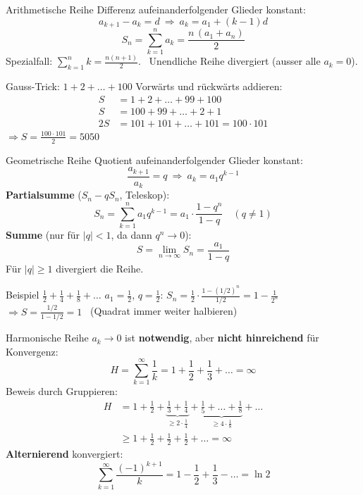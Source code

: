 \documentclass[a4paper, fontsize=7pt]{scrartcl}
\begin{document}
\begin{mainbox}{Arithmetische Reihe}
Differenz aufeinanderfolgender Glieder konstant:
$$a_{k+1} - a_k = d \ \Rightarrow\ a_k = a_1 + (k-1)d$$
$$\boxed{S_n = \sum_{k=1}^{n} a_k = \frac{n\,(a_1 + a_n)}{2}}$$
Spezialfall: $\sum_{k=1}^{n} k = \frac{n(n+1)}{2}$. \ Unendliche Reihe
divergiert (ausser alle $a_k = 0$).
\end{mainbox}

\begin{subbox}{Gauss-Trick: $1 + 2 + \ldots + 100$}
Vorwärts und rückwärts addieren:
\begin{align*}
S &= 1 + 2 + \ldots + 99 + 100\\
S &= 100 + 99 + \ldots + 2 + 1\\
2S &= 101 + 101 + \ldots + 101 = 100 \cdot 101
\end{align*}
$\Rightarrow S = \frac{100 \cdot 101}{2} = 5050$
\end{subbox}

\begin{mainbox}{Geometrische Reihe}
Quotient aufeinanderfolgender Glieder konstant:
$$\frac{a_{k+1}}{a_k} = q \ \Rightarrow\ a_k = a_1 q^{k-1}$$
\textbf{Partialsumme} ($S_n - qS_n$, Teleskop):
$$\boxed{S_n = \sum_{k=1}^{n} a_1 q^{k-1} = a_1 \cdot \frac{1 - q^n}{1 - q}}
\quad (q \neq 1)$$
\textbf{Summe} (nur für $|q| < 1$, da dann $q^n \to 0$):
$$\boxed{S = \lim_{n\to\infty} S_n = \frac{a_1}{1 - q}}$$
Für $|q| \ge 1$ divergiert die Reihe.
\end{mainbox}

\begin{subbox}{Beispiel $\frac12 + \frac14 + \frac18 + \ldots$}
$a_1 = \frac12$, $q = \frac12$:
$S_n = \frac12 \cdot \frac{1 - (1/2)^n}{1/2} = 1 - \frac{1}{2^n}$\\
$\Rightarrow S = \frac{1/2}{1 - 1/2} = 1$ \ (Quadrat immer weiter halbieren)
\end{subbox}

\begin{mainbox}{Harmonische Reihe}
$a_k \to 0$ ist \textbf{notwendig}, aber \textbf{nicht hinreichend} für
Konvergenz:
$$H = \sum_{k=1}^{\infty} \frac1k = 1 + \frac12 + \frac13 + \ldots = \infty$$
Beweis durch Gruppieren:
\begin{align*}
H &= 1 + \tfrac12 + \underbrace{\tfrac13 + \tfrac14}_{\ge 2\cdot\frac14}
     + \underbrace{\tfrac15 + \ldots + \tfrac18}_{\ge 4\cdot\frac18} + \ldots\\
  &\ge 1 + \tfrac12 + \tfrac12 + \tfrac12 + \ldots = \infty
\end{align*}
\textbf{Alternierend} konvergiert:
$$\sum_{k=1}^{\infty} \frac{(-1)^{k+1}}{k} = 1 - \frac12 + \frac13 - \ldots
= \ln 2$$
\end{mainbox}
\end{document}
